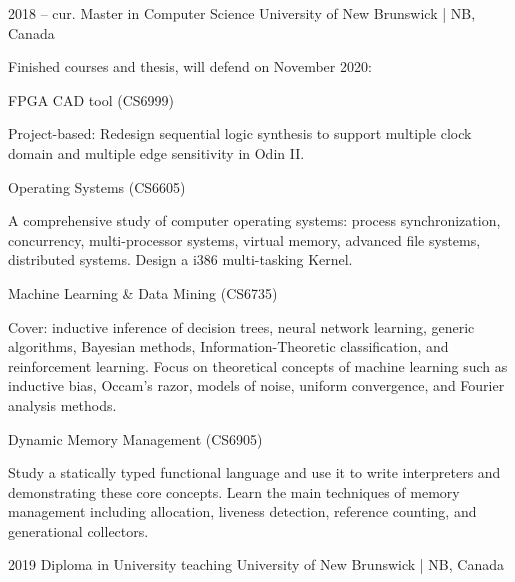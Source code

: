 \documentclass{developercv} %
\begin{document}


\entrys
{2018 -- cur.}
{Master in Computer Science}
{University of New Brunswick | NB, Canada}
{Finished courses and thesis, will defend on November 2020:
	\begin{tightemize}
		\item FPGA CAD tool (CS6999)
		\begin{smallQuote}
			Project-based: Redesign sequential logic synthesis to support multiple clock domain and multiple edge sensitivity in Odin II.
		\end{smallQuote}

		\item Operating Systems (CS6605)
		\begin{smallQuote}
			A comprehensive study of computer operating systems: process synchronization, concurrency, multi-processor systems, virtual memory, advanced file systems, distributed systems.
			Design a i386 multi-tasking Kernel.
		\end{smallQuote}

		\item Machine Learning \& Data Mining (CS6735)
		\begin{smallQuote}
			Cover: inductive inference of decision trees, neural network learning, generic algorithms, Bayesian methods, Information-Theoretic classification, and reinforcement learning.
			Focus on theoretical concepts of machine learning such as inductive bias, Occam's razor, models of noise, uniform convergence, and Fourier analysis methods.
		\end{smallQuote}

		\item Dynamic Memory Management (CS6905)
		\begin{smallQuote}
			Study a statically typed functional language and use it to write interpreters and demonstrating these core concepts.
			Learn the main techniques of memory management including allocation, liveness detection, reference counting, and generational collectors.
		\end{smallQuote}
	\end{tightemize}
}

\entrys
{2019}
{Diploma in University teaching}
{University of New Brunswick | NB, Canada}
{}
\end{document}
